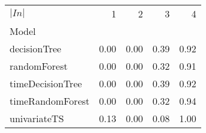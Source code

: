 \begin{tabular}{lrrrr}
\toprule
$|In|$ & 1 & 2 & 3 & 4 \\
Model &  &  &  &  \\
\midrule
decisionTree & 0.00 & 0.00 & 0.39 & 0.92 \\
randomForest & 0.00 & 0.00 & 0.32 & 0.91 \\
timeDecisionTree & 0.00 & 0.00 & 0.39 & 0.92 \\
timeRandomForest & 0.00 & 0.00 & 0.32 & 0.94 \\
univariateTS & 0.13 & 0.00 & 0.08 & 1.00 \\
\bottomrule
\end{tabular}
